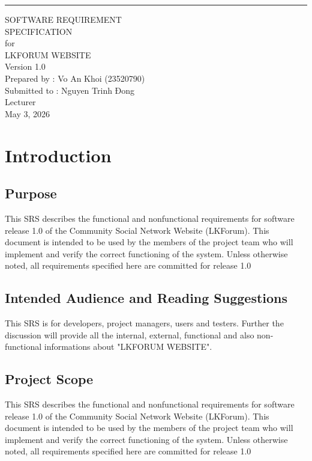 \documentclass{scrreprt}
\date{}
\def\myversion{1.0 }
\begin{document}
\begin{flushright}
	\rule{16cm}{5pt}\vskip1cm
	\begin{bfseries}
		\Huge{SOFTWARE REQUIREMENT \\ SPECIFICATION}\\
		\vspace{1.5cm}
		for\\
		\vspace{1.5cm}
		LKFORUM WEBSITE\\
		\vspace{1.5cm}
		\LARGE{Version \myversion}\\
		\vspace{1.5cm}
		Prepared by : Vo An Khoi (23520790)\\
		\vspace{1.5cm}
		Submitted to : Nguyen Trinh Đong \\Lecturer\\
		\vspace{1.5cm}
		May 3, 2026\\
	\end{bfseries}
\end{flushright}

\tableofcontents

\chapter{Introduction}

\section{Purpose}
This SRS describes the functional and nonfunctional requirements for software release 1.0 of the Community Social Network Website (LKForum). This document is intended to be used by the members of the project team who will implement and verify the correct functioning of the system. Unless otherwise noted, all requirements specified here are committed for release 1.0

\section{Intended Audience and Reading Suggestions}
This SRS is for developers, project managers, users and testers. Further the discussion will provide all the internal, external, functional and also non-functional informations about "LKFORUM WEBSITE".

\section{Project Scope}
This SRS describes the functional and nonfunctional requirements for software release 1.0 of the Community Social Network Website (LKForum). This document is intended to be used by the members of the project team who will implement and verify the correct functioning of the system. Unless otherwise noted, all requirements specified here are committed for release 1.0
\end{document}
